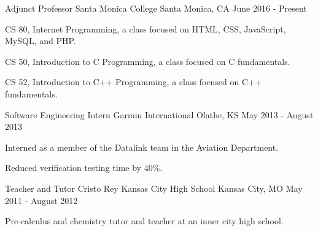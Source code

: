 


\begin{cventries}


\cventry
{Adjunct Professor}
{Santa Monica College}
{Santa Monica, CA}
{June 2016 - Present}
{
\begin{cvitems}
\item CS 80, Internet Programming, a class focused on HTML, CSS, JavaScript, MySQL, and PHP.
\item CS 50, Introduction to C Programming, a class focused on C fundamentals.
\item CS 52, Introduction to C++ Programming, a class focused on C++ fundamentals.
\end{cvitems}
}


\cventry
{Software Engineering Intern}
{Garmin International}
{Olathe, KS}
{May 2013 - August 2013}
{
\begin{cvitems}
\item Interned as a member of the Datalink team in the Aviation Department. 
\item Reduced verification testing time by 40\%.
\end{cvitems}
}


\cventry
{Teacher and Tutor}
{Cristo Rey Kansas City High School}
{Kansas City, MO}
{May 2011 - August 2012}
{
\begin{cvitems}
\item Pre-calculus and chemistry tutor and teacher at an inner city high school. 
\end{cvitems}
}

\end{cventries}